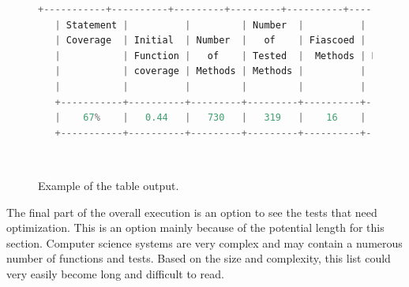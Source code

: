         \begin{figure}[t!]
        \begin{lstlisting}[language = Python, frame = single, basicstyle=\tiny]
   +-----------+----------+---------+---------+----------+---------------+---------+----------+
   | Statement |          |         | Number  |          |    Number     | Number  |          |
   | Coverage  | Initial  | Number  |   of    | Fiascoed |      of       |   of    | Updated  |
   |           | Function |   of    | Tested  |  Methods | Pseudo-tested |  Truly  | Coverage |
   |           | coverage | Methods | Methods |          |    Methods    | Tested  |          |
   |           |          |         |         |          |               | Methods |          |
   +-----------+----------+---------+---------+----------+---------------+---------+----------+
   |    67%    |   0.44   |   730   |   319   |    16    |       9       |   310   |   0.42   |
   +-----------+----------+---------+---------+----------+---------------+---------+----------+
        \end{lstlisting}
        \caption{Example of the table output.}~\label{tableOutput}
        \end{figure}

        The final part of the overall execution is an option to see the tests that need optimization. This is an option mainly because of the potential length for this section. Computer science systems are very complex and may contain a numerous number of functions and tests. Based on the size and complexity, this list could very easily become long and difficult to read.
